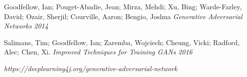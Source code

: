 \documentclass[12pt, a4paper]{report}
\begin{document}
    

    
    
    \newpage
    

    \newpage
    
    
    \newpage
    \tableofcontents

    

    \newpage
    \begin{thebibliography}{99}
        Goodfellow, Ian; Pouget-Abadie, Jean; Mirza, Mehdi; Xu, Bing; Warde-Farley, 
        David; Ozair, Sherjil; Courville, Aaron; Bengio, Joshua 
        \textit{Generative Adversarial Networks 2014}
    
        Salimans, Tim; Goodfellow, Ian; Zaremba, Wojciech; Cheung, Vicki; 
        Radford, Alec; Chen, Xi. 
        \textit{Improved Techniques for Training GANs 2016}

      \textit{https://deeplearning4j.org/generative-adversarial-network}

\end{thebibliography}
\end{document}
